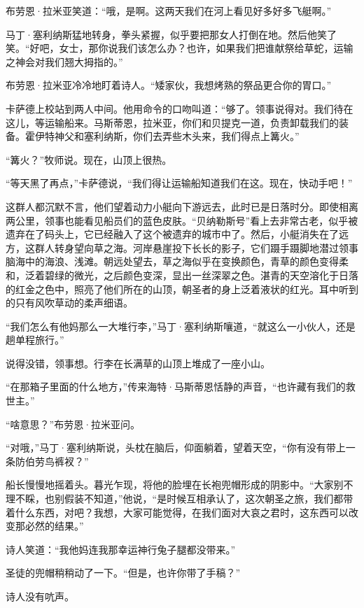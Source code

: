 \documentclass[AutoFakeBold=true]{book}
\begin{document}
布劳恩·拉米亚笑道：``哦，是啊。这两天我们在河上看见好多好多飞艇啊。''

马丁·塞利纳斯猛地转身，拳头紧握，似乎要把那女人打倒在地。然后他笑了笑。``好吧，女士，那你说我们该怎么办？也许，如果我们把谁献祭给草蛇，运输之神会对我们翘大拇指的。''

布劳恩·拉米亚冷冷地盯着诗人。``矮家伙，我想烤熟的祭品更合你的胃口。''

卡萨德上校站到两人中间。他用命令的口吻叫道：``够了。领事说得对。我们待在这儿，等运输船来。马斯蒂恩，拉米亚，你们和贝提克一道，负责卸载我们的装备。霍伊特神父和塞利纳斯，你们去弄些木头来，我们得点上篝火。''

``篝火？''牧师说。现在，山顶上很热。

``等天黑了再点，''卡萨德说，``我们得让运输船知道我们在这。现在，快动手吧！''

\vspace*{1em}

这群人都沉默不言，他们望着动力小艇向下游远去，此时已是日落时分。即使相离两公里，领事也能看见船员们的蓝色皮肤。``贝纳勒斯号''看上去非常古老，似乎被遗弃在了码头上，它已经融入了这个被遗弃的城市中了。然后，小艇消失在了远方，这群人转身望向草之海。河岸悬崖投下长长的影子，它们蹑手蹑脚地潜过领事脑海中的海浪、浅滩。朝远处望去，草之海似乎在变换颜色，青草的颜色变得柔和，泛着碧绿的微光，之后颜色变深，显出一丝深翠之色。湛青的天空溶化于日落的红金之色中，照亮了他们所在的山顶，朝圣者的身上泛着液状的红光。耳中听到的只有风吹草动的柔声细语。

``我们怎么有他妈那么一大堆行李，''马丁·塞利纳斯嚷道，``就这么一小伙人，还是趟单程旅行。''

说得没错，领事想。行李在长满草的山顶上堆成了一座小山。

``在那箱子里面的什么地方，''传来海特·马斯蒂恩恬静的声音，``也许藏有我们的救世主。''

``啥意思？''布劳恩·拉米亚问。

``对哦，''马丁·塞利纳斯说，头枕在脑后，仰面躺着，望着天空，``你有没有带上一条防伯劳鸟裤衩？''

船长慢慢地摇着头。暮光乍现，将他的脸埋在长袍兜帽形成的阴影中。``大家别不理不睬，也别假装不知道，''他说，``是时候互相承认了，这次朝圣之旅，我们都带着什么东西，对吧？我想，大家可能觉得，在我们面对大哀之君时，这东西可以改变那必然的结果。''

诗人笑道：``我他妈连我那幸运神行兔子腿都没带来。''

圣徒的兜帽稍稍动了一下。``但是，也许你带了手稿？''

诗人没有吭声。
\end{document}

